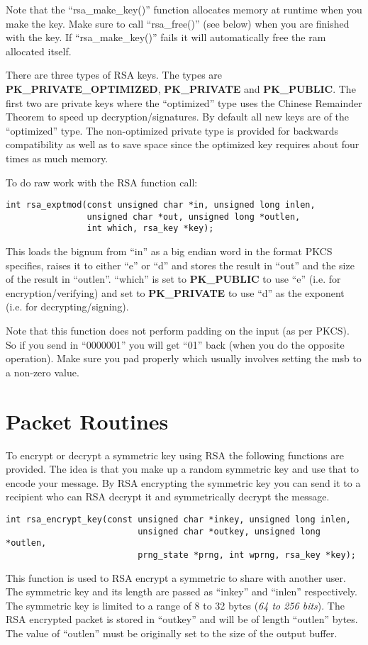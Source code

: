 \documentclass[b5paper]{book}
\begin{document}
Note that the ``rsa\_make\_key()'' function allocates memory at runtime when you make the key.  Make sure to call 
``rsa\_free()'' (see below) when you are finished with the key.  If ``rsa\_make\_key()'' fails it will automatically 
free the ram allocated itself.

There are three types of RSA keys.  The types are {\bf PK\_PRIVATE\_OPTIMIZED}, {\bf PK\_PRIVATE} and {\bf PK\_PUBLIC}.  The first
two are private keys where the ``optimized'' type uses the Chinese Remainder Theorem to speed up decryption/signatures.  By 
default all new keys are of the ``optimized'' type.  The non-optimized private type is provided for backwards compatibility
as well as to save space since the optimized key requires about four times as much memory.

To do raw work with the RSA function call:
\begin{verbatim}
int rsa_exptmod(const unsigned char *in, unsigned long inlen, 
                unsigned char *out, unsigned long *outlen, 
                int which, rsa_key *key);
\end{verbatim}
This loads the bignum from ``in'' as a big endian word in the format PKCS specifies, raises it to either ``e'' or ``d'' and stores the result
in ``out'' and the size of the result in ``outlen''. ``which'' is set to {\bf PK\_PUBLIC} to use ``e'' 
(i.e. for encryption/verifying) and set to {\bf PK\_PRIVATE} to use ``d'' as the exponent (i.e. for decrypting/signing).

Note that this function does not perform padding on the input (as per PKCS).  So if you send in ``0000001'' you will
get ``01'' back (when you do the opposite operation).  Make sure you pad properly which usually involves setting the msb to
a non-zero value.

\section{Packet Routines}
To encrypt or decrypt a symmetric key using RSA the following functions are provided.  The idea is that you make up
a random symmetric key and use that to encode your message.  By RSA encrypting the symmetric key you can send it to a
recipient who can RSA decrypt it and symmetrically decrypt the message.
\begin{verbatim}
int rsa_encrypt_key(const unsigned char *inkey, unsigned long inlen,
                          unsigned char *outkey, unsigned long *outlen,
                          prng_state *prng, int wprng, rsa_key *key);
\end{verbatim}
This function is used to RSA encrypt a symmetric to share with another user.  The symmetric key and its length are
passed as ``inkey'' and ``inlen'' respectively.  The symmetric key is limited to a range of 8 to 32 bytes 
(\textit{64 to 256 bits}).  The RSA encrypted packet is stored in ``outkey'' and will be of length ``outlen'' bytes.  The
value of ``outlen'' must be originally set to the size of the output buffer. 
\end{document}
